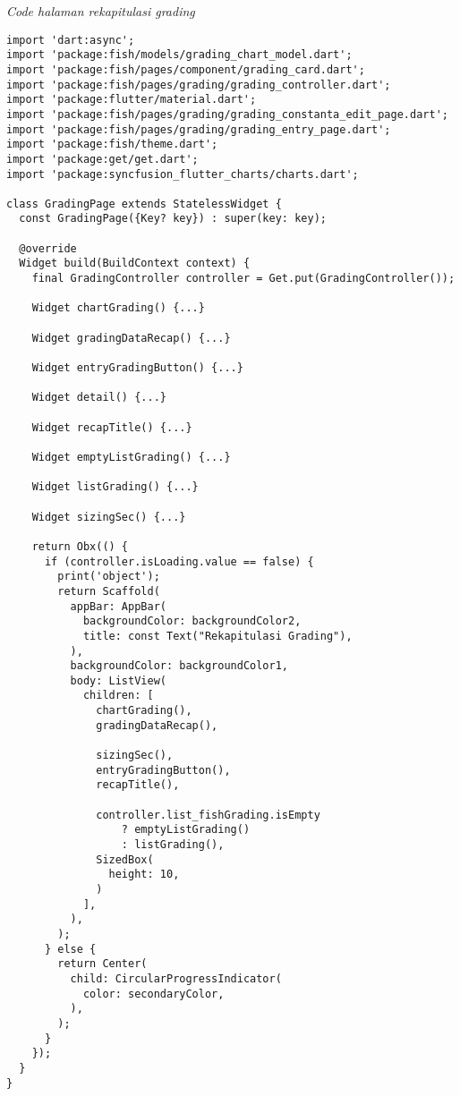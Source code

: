 	\textit{Code halaman rekapitulasi grading}
	\begin{lstlisting}
import 'dart:async';
import 'package:fish/models/grading_chart_model.dart';
import 'package:fish/pages/component/grading_card.dart';
import 'package:fish/pages/grading/grading_controller.dart';
import 'package:flutter/material.dart';
import 'package:fish/pages/grading/grading_constanta_edit_page.dart';
import 'package:fish/pages/grading/grading_entry_page.dart';
import 'package:fish/theme.dart';
import 'package:get/get.dart';
import 'package:syncfusion_flutter_charts/charts.dart';

class GradingPage extends StatelessWidget {
  const GradingPage({Key? key}) : super(key: key);

  @override
  Widget build(BuildContext context) {
    final GradingController controller = Get.put(GradingController());

    Widget chartGrading() {...}

    Widget gradingDataRecap() {...}

    Widget entryGradingButton() {...}

    Widget detail() {...}

    Widget recapTitle() {...}

    Widget emptyListGrading() {...}

    Widget listGrading() {...}

    Widget sizingSec() {...}

    return Obx(() {
      if (controller.isLoading.value == false) {
        print('object');
        return Scaffold(
          appBar: AppBar(
            backgroundColor: backgroundColor2,
            title: const Text("Rekapitulasi Grading"),
          ),
          backgroundColor: backgroundColor1,
          body: ListView(
            children: [
              chartGrading(),
              gradingDataRecap(),
 
              sizingSec(),
              entryGradingButton(),
              recapTitle(),

              controller.list_fishGrading.isEmpty
                  ? emptyListGrading()
                  : listGrading(),
              SizedBox(
                height: 10,
              )
            ],
          ),
        );
      } else {
        return Center(
          child: CircularProgressIndicator(
            color: secondaryColor,
          ),
        );
      }
    });
  }
}

	\end{lstlisting}

